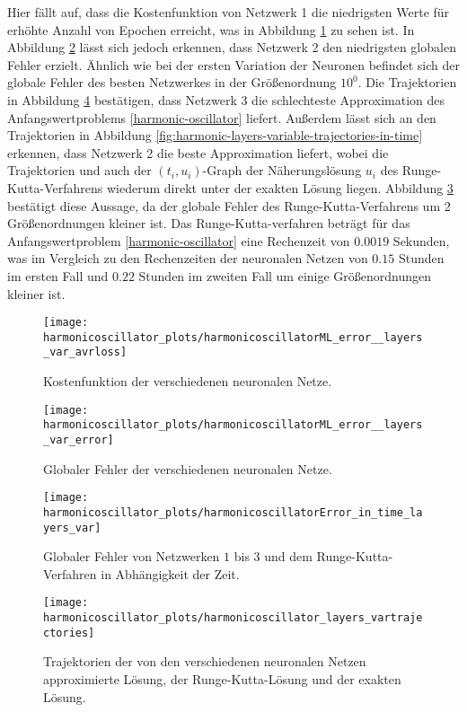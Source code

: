 Hier fällt auf, dass die Kostenfunktion von Netzwerk 1 die niedrigsten Werte für erhöhte Anzahl von Epochen erreicht,
was in Abbildung \ref{fig:harmonic-layers-variable-loss} zu sehen ist. In Abbildung
\ref{fig:harmonic-layers-variable-error} lässt sich jedoch erkennen, dass Netzwerk 2 den niedrigsten globalen Fehler
erzielt. Ähnlich wie bei der ersten Variation der
Neuronen befindet sich der globale Fehler des besten Netzwerkes in der Größenordnung $10^0$. Die Trajektorien in
Abbildung \ref{fig:harmonic-layers-variable-trajectories} bestätigen, dass Netzwerk 3 die schlechteste Approximation des
Anfangswertproblems \eqref{harmonic-oscillator} liefert. Außerdem lässt sich an den Trajektorien in Abbildung
\ref{fig:harmonic-layers-variable-trajectories-in-time} erkennen, dass Netzwerk 2 die beste Approximation liefert,
wobei die Trajektorien und auch der $(t_i,u_i)$-Graph der Näherungslösung $u_i$ des Runge-Kutta-Verfahrens wiederum
direkt unter der exakten Lösung liegen. Abbildung \ref{fig:harmonic-layers-variable-error-in-time} bestätigt diese
Aussage, da der globale Fehler des Runge-Kutta-Verfahrens um 2 Größenordnungen kleiner ist. Das Runge-Kutta-verfahren
beträgt für das Anfangswertproblem \eqref{harmonic-oscillator} eine Rechenzeit von $0.0019$ Sekunden, was im Vergleich
zu den Rechenzeiten der neuronalen Netzen von $0.15$ Stunden im ersten Fall und $0.22$ Stunden im zweiten Fall um einige
Größenordnungen kleiner ist.
\begin{figure}
       \centering
       \texttt{[image: harmonicoscillator\_plots/harmonicoscillatorML\_error\_\_layers\_var\_avrloss]}
       \caption{Kostenfunktion der verschiedenen neuronalen Netze.}
       \label{fig:harmonic-layers-variable-loss}
\end{figure}
\begin{figure}
       \centering
       \texttt{[image: harmonicoscillator\_plots/harmonicoscillatorML\_error\_\_layers\_var\_error]}
       \caption{Globaler Fehler der verschiedenen neuronalen Netze.}
       \label{fig:harmonic-layers-variable-error}
\end{figure}
\begin{figure}
       \centering
       \texttt{[image: harmonicoscillator\_plots/harmonicoscillatorError\_in\_time\_layers\_var]}
       \caption{Globaler Fehler von Netzwerken $1$ bis $3$ und dem Runge-Kutta-Verfahren in Abhängigkeit der Zeit.}
       \label{fig:harmonic-layers-variable-error-in-time}
\end{figure}
\begin{figure}
       \centering
       \texttt{[image: harmonicoscillator\_plots/harmonicoscillator\_layers\_vartrajectories]}
       \caption{Trajektorien der von den verschiedenen neuronalen Netzen approximierte Lösung, der Runge-Kutta-Lösung
       und der exakten Lösung.}
       \label{fig:harmonic-layers-variable-trajectories}
\end{figure}
